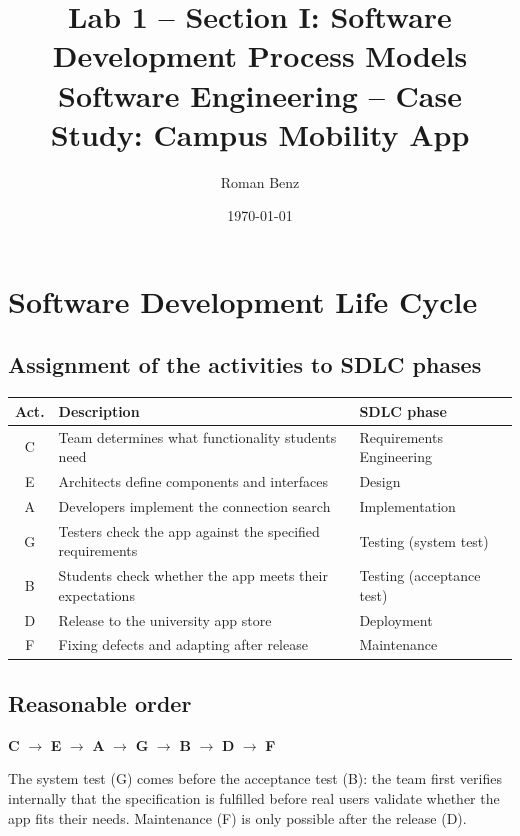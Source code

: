 \documentclass[11pt,a4paper]{article}
\title{\textbf{Lab 1 -- Section I: Software Development Process Models}\\[0.3em]
\large Software Engineering -- Case Study: Campus Mobility App}
\author{Roman Benz}
\date{\today}
\begin{document}
\maketitle

\section{Software Development Life Cycle}

\subsection*{Assignment of the activities to SDLC phases}

\begin{tabularx}{\textwidth}{@{}c L l@{}}
\toprule
\textbf{Act.} & \textbf{Description} & \textbf{SDLC phase} \\
\midrule
C & Team determines what functionality students need & Requirements Engineering \\
E & Architects define components and interfaces      & Design \\
A & Developers implement the connection search        & Implementation \\
G & Testers check the app against the specified requirements & Testing (system test) \\
B & Students check whether the app meets their expectations  & Testing (acceptance test) \\
D & Release to the university app store               & Deployment \\
F & Fixing defects and adapting after release         & Maintenance \\
\bottomrule
\end{tabularx}

\subsection*{Reasonable order}

\begin{answer}
\centering
\textbf{C} $\rightarrow$ \textbf{E} $\rightarrow$ \textbf{A} $\rightarrow$
\textbf{G} $\rightarrow$ \textbf{B} $\rightarrow$ \textbf{D} $\rightarrow$
\textbf{F}
\end{answer}

The system test (G) comes before the acceptance test (B): the team first
verifies internally that the specification is fulfilled before real users
validate whether the app fits their needs. Maintenance (F) is only possible
after the release (D).
\end{document}
